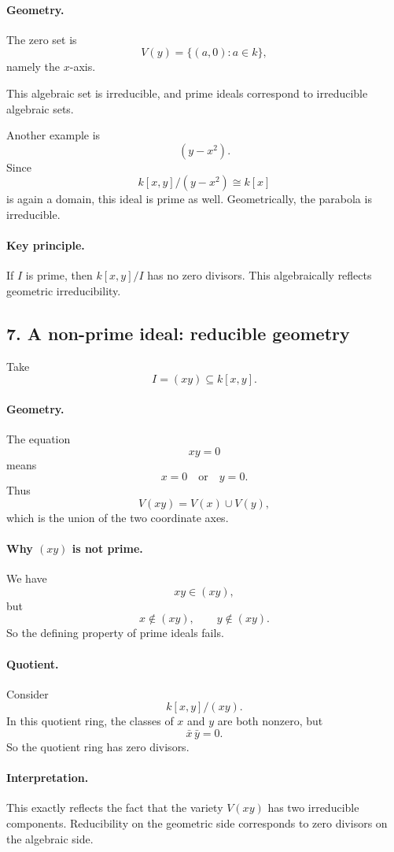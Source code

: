 \documentclass[12pt,a4paper]{article}
\theoremstyle{plain}
\theoremstyle{definition}      %
\begin{document}
	\paragraph{Geometry.}
	The zero set is
	\[
	V(y)=\{(a,0): a\in k\},
	\]
	namely the \(x\)-axis.
	
	This algebraic set is irreducible, and prime ideals correspond to irreducible algebraic sets.
	
	\medskip
	
	Another example is
	\[
	(y-x^2).
	\]
	Since
	\[
	k[x,y]/(y-x^2)\cong k[x]
	\]
	is again a domain, this ideal is prime as well. Geometrically, the parabola is irreducible.
	
	\paragraph{Key principle.}
	If \(I\) is prime, then \(k[x,y]/I\) has no zero divisors. This algebraically reflects geometric irreducibility.
	
	\subsection*{7. A non-prime ideal: reducible geometry}
	
	Take
	\[
	I=(xy)\subseteq k[x,y].
	\]
	
	\paragraph{Geometry.}
	The equation
	\[
	xy=0
	\]
	means
	\[
	x=0 \quad \text{or} \quad y=0.
	\]
	Thus
	\[
	V(xy)=V(x)\cup V(y),
	\]
	which is the union of the two coordinate axes.
	
	\paragraph{Why \((xy)\) is not prime.}
	We have
	\[
	xy\in (xy),
	\]
	but
	\[
	x\notin (xy), \qquad y\notin (xy).
	\]
	So the defining property of prime ideals fails.
	
	\paragraph{Quotient.}
	Consider
	\[
	k[x,y]/(xy).
	\]
	In this quotient ring, the classes of \(x\) and \(y\) are both nonzero, but
	\[
	\bar x\,\bar y = 0.
	\]
	So the quotient ring has zero divisors.
	
	\paragraph{Interpretation.}
	This exactly reflects the fact that the variety \(V(xy)\) has two irreducible components. Reducibility on the geometric side corresponds to zero divisors on the algebraic side.
	
\end{document}
